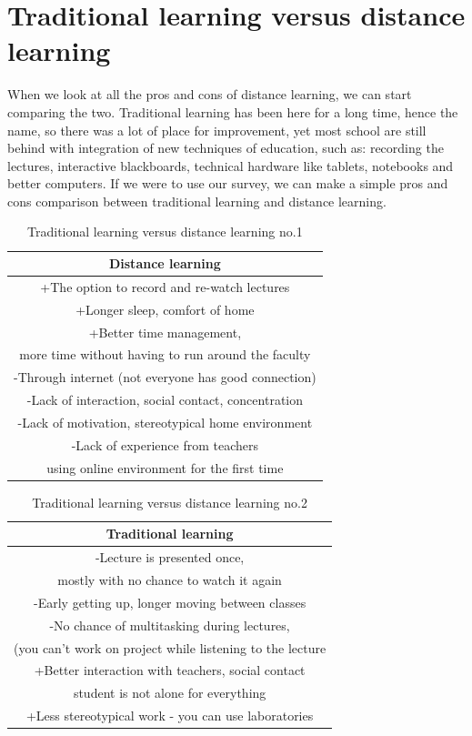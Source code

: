 \documentclass[10pt,twoside,english,a4paper]{article}
\begin{document}
\section{Traditional learning versus distance learning}
When we look at all the pros and cons of distance learning, we can start comparing the two. Traditional learning has been here for a long time, hence the name, so there was a lot of place for improvement, yet most school are still behind with integration of new techniques of education, such as: recording the lectures, interactive blackboards, technical hardware like tablets, notebooks and better computers. If we were to use our survey, we can make a simple pros and cons comparison between traditional learning and distance learning.
\begin{table}[h!]
\caption{Traditional learning versus distance learning no.1}
\centering
 \begin{tabular}{||c||}
 \hline
  Distance learning\\ [0.5ex] 
 \hline\hline
 +The option to record and re-watch lectures\\ 
 \hline
 +Longer sleep, comfort of home\\
 \hline
 +Better time management,\\ more time without having to run around the faculty\\
 \hline
 -Through internet (not everyone has good connection)\\
 \hline
 -Lack of interaction, social contact, concentration\\
 \hline
 -Lack of motivation, stereotypical home environment\\
 \hline
 -Lack of experience from teachers\\ using online environment for the first time\\
 \hline
\end{tabular}
\end{table}

\begin{table}[hbt]
\caption{Traditional learning versus distance learning no.2}
\centering
 \begin{tabular}{||c||}
 \hline
  Traditional learning\\ [0.5ex] 
 \hline\hline
 -Lecture is presented once,\\ mostly with no chance to watch it again\\ 
 \hline
 -Early getting up, longer moving between classes\\
 \hline
 -No chance of multitasking during lectures,\\(you can't work on project while listening to the lecture\\
 \hline
 +Better interaction with teachers, social contact\\ student is not alone for everything\\
 \hline
 +Less stereotypical work - you can use laboratories\\
 \hline
\end{tabular}
\end{table}
\newpage
\end{document}
